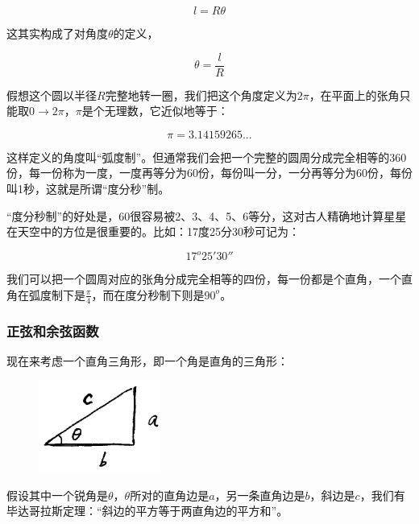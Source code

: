 \begin{equation}
l = R \theta
\end{equation}

这其实构成了对角度$\theta$的定义，

\begin{equation}
\theta = \frac{l }{R }
\end{equation}

假想这个圆以半径$R$完整地转一圈，我们把这个角度定义为$2 \pi$，在平面上的张角只能取$0 \to 2 \pi$，$\pi$是个无理数，它近似地等于：

\begin{equation}
\pi = 3.14159265 ...
\end{equation}

这样定义的角度叫“弧度制”。但通常我们会把一个完整的圆周分成完全相等的360份，每一份称为一度，一度再等分为60份，每份叫一分，一分再等分为60份，每份叫1秒，这就是所谓“度分秒”制。

“度分秒制”的好处是，60很容易被2、3、4、5、6等分，这对古人精确地计算星星在天空中的方位是很重要的。比如：17度25分30秒可记为：

\begin{equation*}
17^o 25' 30''
\end{equation*}

我们可以把一个圆周对应的张角分成完全相等的四份，每一份都是个直角，一个直角在弧度制下是$\frac{\pi}{4}$，而在度分秒制下则是$90^o$。

\subsubsection{正弦和余弦函数}

现在来考虑一个直角三角形，即一个角是直角的三角形：

\begin{figure}[htbp]
\begin{center}
\includegraphics[width=4cm]{Preface/rectriangle.png}
\end{center}
\end{figure}

假设其中一个锐角是$\theta$，$\theta$所对的直角边是$a$，另一条直角边是$b$，斜边是$c$，我们有毕达哥拉斯定理：“斜边的平方等于两直角边的平方和”。

